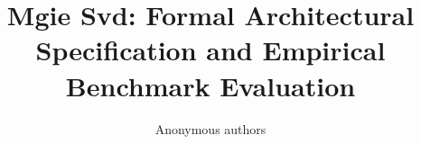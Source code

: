 \title{\textbf{Mgie Svd: Formal Architectural Specification and Empirical Benchmark Evaluation}}

\author{Anonymous authors}
